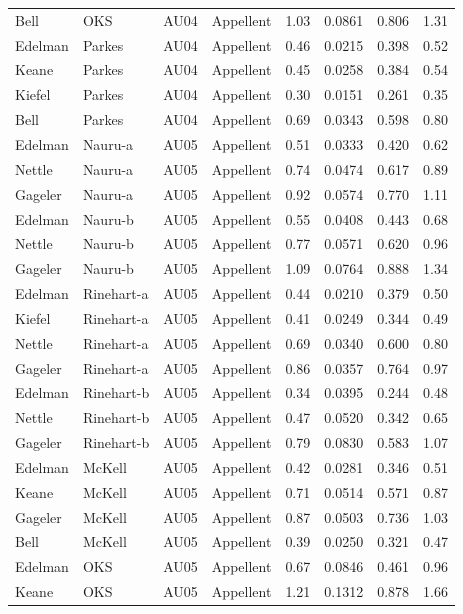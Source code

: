 \documentclass{monashthesis}
\begin{document}
\begin{center}
\begin{longtable}{llllllll}
Bell & OKS & AU04 & Appellent & 1.03 & 0.0861 & 0.806 & 1.31 \\
Edelman & Parkes & AU04 & Appellent & 0.46 & 0.0215 & 0.398 & 0.52 \\
Keane & Parkes & AU04 & Appellent & 0.45 & 0.0258 & 0.384 & 0.54 \\
Kiefel & Parkes & AU04 & Appellent & 0.30 & 0.0151 & 0.261 & 0.35 \\
Bell & Parkes & AU04 & Appellent & 0.69 & 0.0343 & 0.598 & 0.80 \\
Edelman & Nauru-a & AU05 & Appellent & 0.51 & 0.0333 & 0.420 & 0.62 \\
Nettle & Nauru-a & AU05 & Appellent & 0.74 & 0.0474 & 0.617 & 0.89 \\
Gageler & Nauru-a & AU05 & Appellent & 0.92 & 0.0574 & 0.770 & 1.11 \\
Edelman & Nauru-b & AU05 & Appellent & 0.55 & 0.0408 & 0.443 & 0.68 \\
Nettle & Nauru-b & AU05 & Appellent & 0.77 & 0.0571 & 0.620 & 0.96 \\
Gageler & Nauru-b & AU05 & Appellent & 1.09 & 0.0764 & 0.888 & 1.34 \\
Edelman & Rinehart-a & AU05 & Appellent & 0.44 & 0.0210 & 0.379 & 0.50 \\
Kiefel & Rinehart-a & AU05 & Appellent & 0.41 & 0.0249 & 0.344 & 0.49 \\
Nettle & Rinehart-a & AU05 & Appellent & 0.69 & 0.0340 & 0.600 & 0.80 \\
Gageler & Rinehart-a & AU05 & Appellent & 0.86 & 0.0357 & 0.764 & 0.97 \\
Edelman & Rinehart-b & AU05 & Appellent & 0.34 & 0.0395 & 0.244 & 0.48 \\
Nettle & Rinehart-b & AU05 & Appellent & 0.47 & 0.0520 & 0.342 & 0.65 \\
Gageler & Rinehart-b & AU05 & Appellent & 0.79 & 0.0830 & 0.583 & 1.07 \\
Edelman & McKell & AU05 & Appellent & 0.42 & 0.0281 & 0.346 & 0.51 \\
Keane & McKell & AU05 & Appellent & 0.71 & 0.0514 & 0.571 & 0.87 \\
Gageler & McKell & AU05 & Appellent & 0.87 & 0.0503 & 0.736 & 1.03 \\
Bell & McKell & AU05 & Appellent & 0.39 & 0.0250 & 0.321 & 0.47 \\
Edelman & OKS & AU05 & Appellent & 0.67 & 0.0846 & 0.461 & 0.96 \\
Keane & OKS & AU05 & Appellent & 1.21 & 0.1312 & 0.878 & 1.66 \\

\end{longtable}
\end{center}
\end{document}

